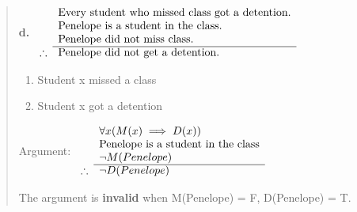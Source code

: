 \documentclass[11pt, oneside]{article}
\begin{document}
\begin{quote}
    \textbf{d. }
    \(
    \begin{array}{rl}
      & \textnormal{Every student who missed class got a detention.} \\
      & \textnormal{Penelope is a student in the class.} \\
      & \textnormal{Penelope did not miss class.} \\
      \cline{2-2}
    \therefore & \textnormal{Penelope did not get a detention.} 
    \end{array}
    \)  
    
    \begin{enumerate}
        \item[M(x):] Student x missed a class
        \item[D(x):] Student x got a detention
    \end{enumerate}
    
    Argument:
    \(
    \begin{array}{rl}
      & \forall x (M(x) \implies D(x)) \\
      & \textnormal{Penelope is a student in the class} \\
      & \neg M(Penelope) \\
      \cline{2-2}
    \therefore & \neg D(Penelope) 
    \end{array}
    \)
    
    The argument is \textbf{invalid} when M(Penelope) = F, D(Penelope) = T.
\end{quote}
\end{document}

